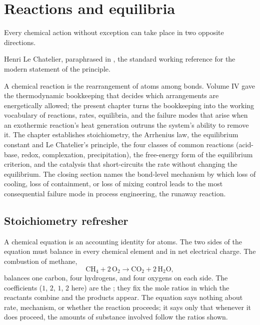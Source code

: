 \chapter{Reactions and equilibria}
\label{vol05:ch02}

\epigraph{Every chemical action without exception can take place in two
opposite directions.}{Henri Le Chatelier, paraphrased in
\textcite[ch.~6]{text:atkins-physical-chemistry}, the standard
working reference for the modern statement of the principle.}


\noindent
A chemical reaction is the rearrangement of atoms among bonds.
Volume IV gave the thermodynamic bookkeeping that decides which
arrangements are energetically allowed; the present chapter turns the
bookkeeping into the working vocabulary of reactions, rates,
equilibria, and the failure modes that arise when an exothermic
reaction's heat generation outruns the system's ability to remove it.
The chapter establishes stoichiometry, the Arrhenius law, the
equilibrium constant and Le Chatelier's principle, the four classes of
common reactions (acid-base, redox, complexation, precipitation), the
free-energy form of the equilibrium criterion, and the catalysis that
short-circuits the rate without changing the equilibrium. The closing
section names the bond-level mechanism by which loss of cooling, loss
of containment, or loss of mixing control leads to the most consequential
failure mode in process engineering, the runaway reaction.

\section{Stoichiometry refresher}

A chemical equation is an accounting identity for atoms. The two sides
of the equation must balance in every chemical element and in net
electrical charge. The combustion of methane,
\[
\text{CH}_4 + 2\,\text{O}_2 \to \text{CO}_2 + 2\,\text{H}_2\text{O},
\]
balances one carbon, four hydrogens, and four oxygens on each side.
The coefficients ($1$, $2$, $1$, $2$ here) are the
; they fix the mole ratios in
which the reactants combine and the products appear. The equation says
nothing about rate, mechanism, or whether the reaction proceeds; it
says only that whenever it does proceed, the amounts of substance
involved follow the ratios shown.

